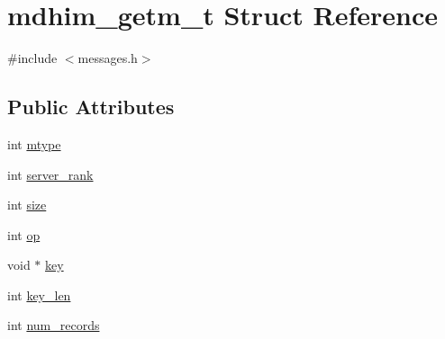 \hypertarget{structmdhim__getm__t}{\section{mdhim\-\_\-getm\-\_\-t Struct Reference}
\label{structmdhim__getm__t}
}


{\ttfamily \#include $<$messages.\-h$>$}

\subsection*{Public Attributes}
\begin{DoxyCompactItemize}
\item 
int \hyperlink{structmdhim__getm__t_a803aef9942bd6bd39d10c22f4f1205d3}{mtype}
\item 
int \hyperlink{structmdhim__getm__t_a2fe10e46b27b008657d3c59299ea1fd6}{server\-\_\-rank}
\item 
int \hyperlink{structmdhim__getm__t_aa6649f87300a3899693521850fa28a17}{size}
\item 
int \hyperlink{structmdhim__getm__t_a81dd92f402e433928b8b3bae7ccdefd8}{op}
\item 
void $\ast$ \hyperlink{structmdhim__getm__t_a53c3aff6037a3e693e09ff4e98bd7eba}{key}
\item 
int \hyperlink{structmdhim__getm__t_a8942a21db02e749c3f3b04b32fea795e}{key\-\_\-len}
\item 
int \hyperlink{structmdhim__getm__t_ad585955cf1b7a3ffce40fc44062583e9}{num\-\_\-records}
\end{DoxyCompactItemize}


